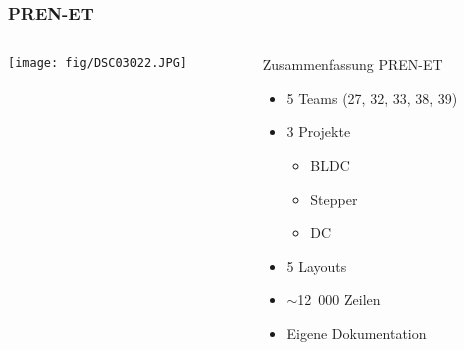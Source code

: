 \begin{frame}
    \frametitle{PREN-ET}
    \begin{columns}
        \begin{column}{0.50\textwidth}
            \centering
            \texttt{[image: fig/DSC03022.JPG]}
        \end{column}
        \begin{column}{0.50\textwidth}
            \begin{block}{Zusammenfassung PREN-ET}
                \begin{itemize}
                    \item 5 Teams (27, 32, 33, 38, 39)
                    \item 3 Projekte
                    \begin{itemize}
                        \item BLDC
                        \item Stepper
                        \item DC
                    \end{itemize}
                    \item 5 Layouts
                    \item $\sim$12~000 Zeilen %
                    \item Eigene Dokumentation
                \end{itemize}
            \end{block}
        \end{column}
    \end{columns}
\end{frame}
